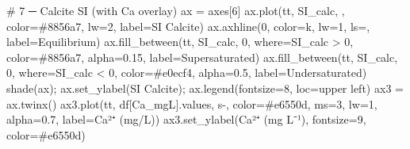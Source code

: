 \documentclass[
  letterpaper,
  DIV=11,
  numbers=noendperiod]{scrartcl}
\newenvironment{Shaded}{\begin{snugshade}}{\end{snugshade}}
\newcommand{\CommentTok}[1]{\textcolor[rgb]{0.37,0.37,0.37}{#1}}
\newcommand{\DecValTok}[1]{\textcolor[rgb]{0.68,0.00,0.00}{#1}}
\newcommand{\FloatTok}[1]{\textcolor[rgb]{0.68,0.00,0.00}{#1}}
\newcommand{\NormalTok}[1]{\textcolor[rgb]{0.00,0.23,0.31}{#1}}
\newcommand{\OperatorTok}[1]{\textcolor[rgb]{0.37,0.37,0.37}{#1}}
\newcommand{\StringTok}[1]{\textcolor[rgb]{0.13,0.47,0.30}{#1}}
\begin{document}
\begin{Shaded}
\begin{Highlighting}[]
\CommentTok{\# 7 ─ Calcite SI  (with Ca overlay)}
\NormalTok{ax }\OperatorTok{=}\NormalTok{ axes[}\DecValTok{6}\NormalTok{]}
\NormalTok{ax.plot(tt, SI\_calc, }\StringTok{\textquotesingle{}{-}\textquotesingle{}}\NormalTok{, color}\OperatorTok{=}\StringTok{\textquotesingle{}\#8856a7\textquotesingle{}}\NormalTok{, lw}\OperatorTok{=}\DecValTok{2}\NormalTok{, label}\OperatorTok{=}\StringTok{\textquotesingle{}SI Calcite\textquotesingle{}}\NormalTok{)}
\NormalTok{ax.axhline(}\DecValTok{0}\NormalTok{, color}\OperatorTok{=}\StringTok{\textquotesingle{}k\textquotesingle{}}\NormalTok{, lw}\OperatorTok{=}\DecValTok{1}\NormalTok{, ls}\OperatorTok{=}\StringTok{\textquotesingle{}{-}{-}\textquotesingle{}}\NormalTok{, label}\OperatorTok{=}\StringTok{\textquotesingle{}Equilibrium\textquotesingle{}}\NormalTok{)}
\NormalTok{ax.fill\_between(tt, SI\_calc, }\DecValTok{0}\NormalTok{, where}\OperatorTok{=}\NormalTok{SI\_calc }\OperatorTok{\textgreater{}} \DecValTok{0}\NormalTok{,}
\NormalTok{                color}\OperatorTok{=}\StringTok{\textquotesingle{}\#8856a7\textquotesingle{}}\NormalTok{, alpha}\OperatorTok{=}\FloatTok{0.15}\NormalTok{, label}\OperatorTok{=}\StringTok{\textquotesingle{}Supersaturated\textquotesingle{}}\NormalTok{)}
\NormalTok{ax.fill\_between(tt, SI\_calc, }\DecValTok{0}\NormalTok{, where}\OperatorTok{=}\NormalTok{SI\_calc }\OperatorTok{\textless{}} \DecValTok{0}\NormalTok{,}
\NormalTok{                color}\OperatorTok{=}\StringTok{\textquotesingle{}\#e0ecf4\textquotesingle{}}\NormalTok{, alpha}\OperatorTok{=}\FloatTok{0.5}\NormalTok{, label}\OperatorTok{=}\StringTok{\textquotesingle{}Undersaturated\textquotesingle{}}\NormalTok{)}
\NormalTok{shade(ax)}\OperatorTok{;}\NormalTok{ ax.set\_ylabel(}\StringTok{\textquotesingle{}SI Calcite\textquotesingle{}}\NormalTok{)}\OperatorTok{;}\NormalTok{ ax.legend(fontsize}\OperatorTok{=}\DecValTok{8}\NormalTok{, loc}\OperatorTok{=}\StringTok{\textquotesingle{}upper left\textquotesingle{}}\NormalTok{)}
\NormalTok{ax3 }\OperatorTok{=}\NormalTok{ ax.twinx()}
\NormalTok{ax3.plot(tt, df[}\StringTok{\textquotesingle{}Ca\_mgL\textquotesingle{}}\NormalTok{].values, }\StringTok{\textquotesingle{}s{-}\textquotesingle{}}\NormalTok{, color}\OperatorTok{=}\StringTok{\textquotesingle{}\#e6550d\textquotesingle{}}\NormalTok{, ms}\OperatorTok{=}\DecValTok{3}\NormalTok{, lw}\OperatorTok{=}\DecValTok{1}\NormalTok{,}
\NormalTok{         alpha}\OperatorTok{=}\FloatTok{0.7}\NormalTok{, label}\OperatorTok{=}\StringTok{\textquotesingle{}Ca²⁺ (mg/L)\textquotesingle{}}\NormalTok{)}
\NormalTok{ax3.set\_ylabel(}\StringTok{\textquotesingle{}Ca²⁺ (mg L⁻¹)\textquotesingle{}}\NormalTok{, fontsize}\OperatorTok{=}\DecValTok{9}\NormalTok{, color}\OperatorTok{=}\StringTok{\textquotesingle{}\#e6550d\textquotesingle{}}\NormalTok{)}

\end{Highlighting}
\end{Shaded}
\end{document}
